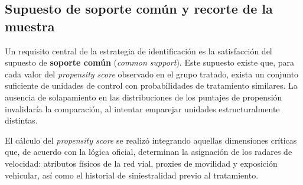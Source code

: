 \subsection{Supuesto de soporte común y recorte de la muestra}
Un requisito central de la estrategia de identificación es la satisfacción del supuesto de \textbf{soporte común} (\textit{common support}). Este supuesto existe que, para cada valor del \textit{propensity score} observado en el grupo tratado, exista un conjunto suficiente de unidades de control con probabilidades de tratamiento similares. La ausencia de solapamiento en las distribuciones de los puntajes de propensión invalidaría la comparación, al intentar emparejar unidades estructuralmente distintas. 

El cálculo del \textit{propensity score} se realizó integrando aquellas dimensiones críticas que, de acuerdo con la lógica oficial, determinan la asignación de los radares de velocidad: atributos físicos de la red vial, proxies de movilidad y exposición vehicular, así como el historial de siniestralidad previo al tratamiento.  
